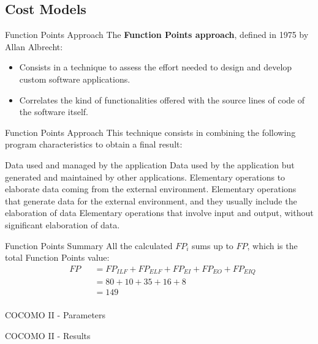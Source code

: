 \documentclass{../Common/Structure/pdf_presentation}
\begin{document}
	\subsection{Cost Models}
	\begin{frame}{Function Points Approach}
		The \textbf{Function Points approach}, defined in 1975 by Allan Albrecht:
		\begin{itemize}
			\item Consists in a technique to assess the effort needed to design and develop custom software applications.
			\item Correlates the kind of functionalities offered with the source lines of code of the software itself.
		\end{itemize}
	\end{frame}
	\begin{frame}{Function Points Approach}
		This technique consists in combining the following program characteristics to obtain a final result:
		\begin{itemize}
			 Data used and managed by the application
			 Data used by the application
but generated and maintained by other applications.
			 Elementary operations to elaborate data coming from the
external environment.
			 Elementary operations that generate data for the external environment, and they usually include the elaboration of data
			 Elementary operations that involve input and output, without significant elaboration of data.
		\end{itemize}
	\end{frame}
	\begin{frame}{Function Points Summary}
		All the calculated $FP_{i}$ sums up to $FP$, which is the total Function Points value:
		\begin{equation*}
			\begin{aligned}
				&	FP
				& & = FP_{ILF} + FP_{ELF} + FP_{EI} + FP_{EO} + FP_{EIQ}\\
				&&& = 80 + 10 + 35 + 16 + 8\\
				&&& = 149\\
			\end{aligned}
		\end{equation*}
	\end{frame}
	\begin{frame}{COCOMO II - Parameters}
	\end{frame}
	\begin{frame}{COCOMO II - Results}
	\end{frame}
\end{document}
